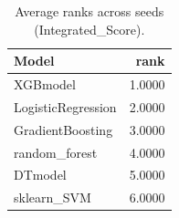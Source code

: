 \begin{table}[t]
\centering
\begin{tabular}{lr}
\toprule
Model & rank \\
\midrule
XGBmodel & 1.0000 \\
LogisticRegression & 2.0000 \\
GradientBoosting & 3.0000 \\
random_forest & 4.0000 \\
DTmodel & 5.0000 \\
sklearn_SVM & 6.0000 \\
\bottomrule
\end{tabular}
\caption{Average ranks across seeds (Integrated_Score).}
\label{tab:avg_rank_Integrated_Score}
\end{table}